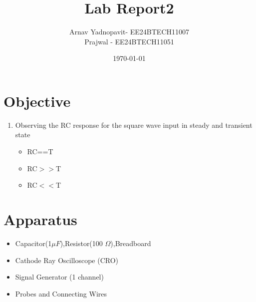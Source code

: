 \documentclass[a4paper,12pt]{article}
\title{Lab Report2}
\author{Arnav Yadnopavit- EE24BTECH11007\\Prajwal - EE24BTECH11051}
\date{\today}
\begin{document}
\maketitle
\section*{Objective}
\begin{enumerate}
    \item Observing the RC response for the square wave input in steady and transient state
    \begin{itemize}
        \item RC==T
        \item RC$>>$T
        \item RC$<<$T
    \end{itemize}
\end{enumerate}
\section*{Apparatus}
\begin{itemize}
    \item Capacitor(1$\mu F$),Resistor(100 $\Omega$),Breadboard
    \item Cathode Ray Oscilloscope (CRO)
    \item Signal Generator (1 channel)
    \item Probes and Connecting Wires
\newpage
\end{itemize}
\end{document}
